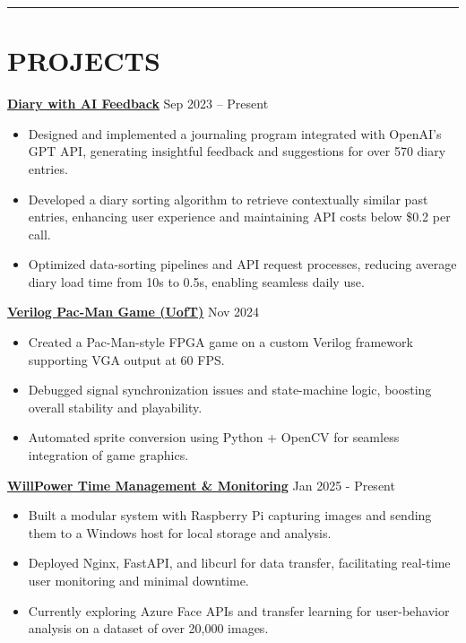\documentclass[a4paper,10pt]{article}
\begin{document}
\noindent\rule{\linewidth}{1pt}

\section*{\textbf{PROJECTS}}

\noindent\href{https://github.com/Ken-2511/Diary-with-ChatGPT-Comment}{\uline{
\textbf{Diary with AI Feedback}}} \hfill Sep 2023 -- Present
\begin{itemize}[leftmargin=0.2in]
    \item Designed and implemented a journaling program integrated with OpenAI’s GPT API, generating insightful feedback and suggestions for over 570 diary entries.
    \item Developed a diary sorting algorithm to retrieve contextually similar past entries, enhancing user experience and maintaining API costs below \$0.2 per call.
    \item Optimized data-sorting pipelines and API request processes, reducing average diary load time from 10s to 0.5s, enabling seamless daily use.
\end{itemize}


\vspace{0.3cm}
\noindent\href{https://github.com/Ken-2511/ECE241-Project}{\uline{
\textbf{Verilog Pac-Man Game (UofT)}}} \hfill Nov 2024
\begin{itemize}[leftmargin=0.2in]
    \item Created a Pac-Man-style FPGA game on a custom Verilog framework supporting VGA output at 60 FPS.
    \item Debugged signal synchronization issues and state-machine logic, boosting overall stability and playability.
    \item Automated sprite conversion using Python + OpenCV for seamless integration of game graphics.
\end{itemize}

\vspace{0.3cm}
\noindent\href{https://github.com/Ken-2511/WillPower}{\uline{
\textbf{WillPower \textbar{} Time Management \& Monitoring}}} \hfill Jan 2025 - Present
\begin{itemize}[leftmargin=0.2in]
    \item Built a modular system with Raspberry Pi capturing images and sending them to a Windows host for local storage and analysis.
    \item Deployed Nginx, FastAPI, and libcurl for data transfer, facilitating real-time user monitoring and minimal downtime.
    \item Currently exploring Azure Face APIs and transfer learning for user-behavior analysis on a dataset of over 20,000 images.
\end{itemize}
\end{document}
